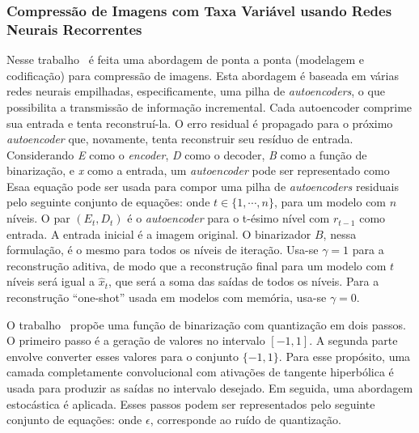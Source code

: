 \subsubsection{Compressão de Imagens com Taxa Variável usando Redes Neurais Recorrentes}
\label{variablerate}
Nesse trabalho~\cite{Variable2016Toderici} é feita uma abordagem de ponta a ponta (modelagem e codificação) para compressão de imagens. Esta abordagem é baseada em várias redes neurais empilhadas, especificamente, uma pilha de \textit{autoencoders}, o que possibilita a transmissão de informação incremental. Cada autoencoder comprime sua entrada e tenta reconstruí-la. O erro residual é propagado para o próximo \textit{autoencoder} que, novamente, tenta reconstruir seu resíduo de entrada. Considerando \textit{E} como o \textit{encoder}, \textit{D} como o decoder, \textit{B} como a função de binarização, e \textit{x} como a entrada, um \textit{autoencoder} pode ser representado como 
Esaa equação pode ser usada para compor uma pilha de \textit{autoencoders} residuais pelo seguinte conjunto de equações:
onde $t \in \{1,\cdots,n\}$, para um modelo com $n$ níveis. O par $(E_t, D_t)$ é o \textit{autoencoder} para o t-ésimo nível com $r_{t-1}$ como entrada. A entrada inicial é a imagem original. O binarizador $B$, nessa formulação, é o mesmo para todos os níveis de iteração. Usa-se $\gamma = 1$ para a reconstrução aditiva, de modo que a reconstrução final para um modelo com $t$ níveis será igual a $\hat{x}_t$, que será a soma das saídas de todos os níveis. Para a reconstrução ``one-shot'' usada em modelos com memória, usa-se $\gamma = 0$.

O trabalho~\cite{Variable2016Toderici} propõe uma função de binarização com quantização em dois passos. O primeiro passo é a geração de valores no intervalo $[-1, 1]$. A segunda parte envolve converter esses valores para o conjunto $\{-1, 1\}$. Para esse propósito, uma camada completamente convolucional com ativações de tangente hiperbólica é usada para produzir as saídas no intervalo desejado. Em seguida, uma abordagem estocástica é aplicada. Esses passos podem ser representados pelo seguinte conjunto de equações:   onde $\epsilon$, corresponde ao ruído de quantização.
    
